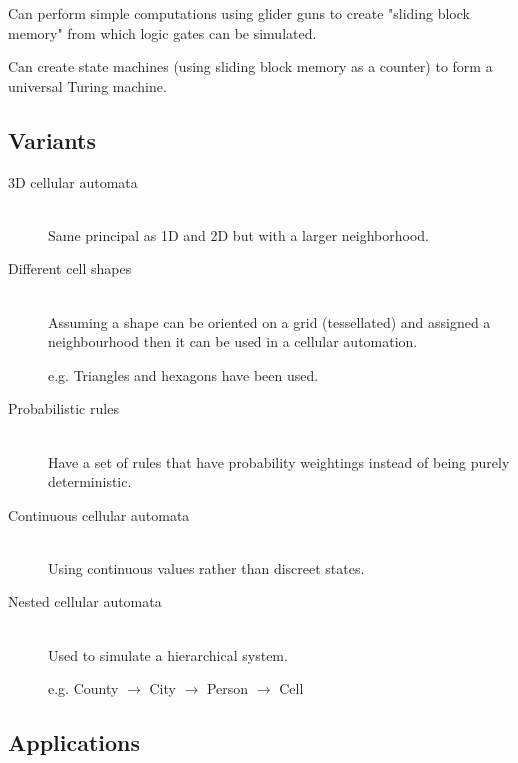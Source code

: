\documentclass[a4paper]{article}
\begin{document}

Can perform simple computations using glider guns to create "sliding block
memory" from which logic gates can be simulated.

Can create state machines (using sliding block memory as a counter) to form a
universal Turing machine.

\subsection{Variants}

\begin{description}
  \item[3D cellular automata] \hfill \\
    Same principal as 1D and 2D but with a larger neighborhood.

  \item[Different cell shapes] \hfill \\
    Assuming a shape can be oriented on a grid (tessellated) and assigned a
    neighbourhood then it can be used in a cellular automation.

    e.g. Triangles and hexagons have been used.

  \item[Probabilistic rules] \hfill \\
    Have a set of rules that have probability weightings instead of being purely
    deterministic.

  \item[Continuous cellular automata] \hfill \\
    Using continuous values rather than discreet states.

  \item[Nested cellular automata] \hfill \\
    Used to simulate a hierarchical system.

    e.g. County $\rightarrow$ City $\rightarrow$ Person $\rightarrow$ Cell

\end{description}

\subsection{Applications}
\end{document}
